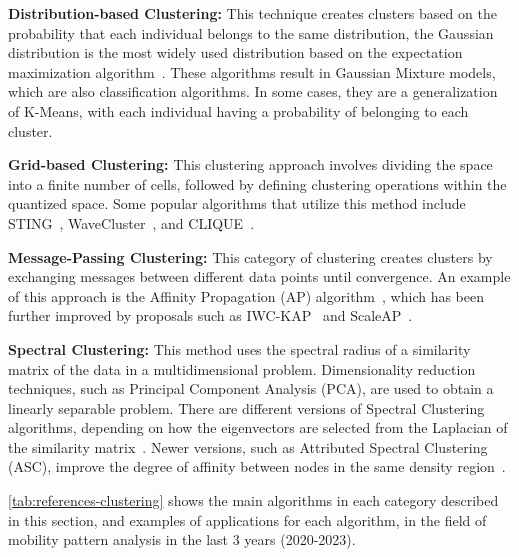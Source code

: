 \textbf{Distribution-based Clustering:} This technique creates clusters based on the probability that each individual belongs to the same distribution, the Gaussian distribution is the most widely used distribution based on the expectation maximization algorithm~\cite{yang2012robust}. These algorithms result in Gaussian Mixture models, which are also classification algorithms. In some cases, they are a generalization of K-Means, with each individual having a probability of belonging to each cluster.

\textbf{Grid-based Clustering:} This clustering approach involves dividing the space into a finite number of cells, followed by defining clustering operations within the quantized space. Some popular algorithms that utilize this method include STING~\cite{wang1997sting}, WaveCluster~\cite{sheikholeslami1998wavecluster}, and CLIQUE~\cite{forster2009clique}.

\textbf{Message-Passing Clustering:} This category of clustering creates clusters by exchanging messages between different data points until convergence. An example of this approach is the Affinity Propagation (AP) algorithm~\cite{frey2007clustering}, which has been further improved by proposals such as IWC-KAP~\cite{serdah2016clustering} and ScaleAP~\cite{shiokawa2021scalable}.

\textbf{Spectral Clustering:} This method uses the spectral radius of a similarity matrix of the data in a multidimensional problem. Dimensionality reduction techniques, such as Principal Component Analysis (PCA), are used to obtain a linearly separable problem. There are different versions of Spectral Clustering algorithms, depending on how the eigenvectors are selected from the Laplacian of the similarity matrix~\cite{von2007tutorial}. Newer versions, such as Attributed Spectral Clustering (ASC), improve the degree of affinity between nodes in the same density region~\cite{berahmand2022novel}.

\cref{tab:references-clustering} shows the main algorithms in each category described in this section, and examples of applications for each algorithm, in the field of mobility pattern analysis in the last 3 years (2020-2023).

